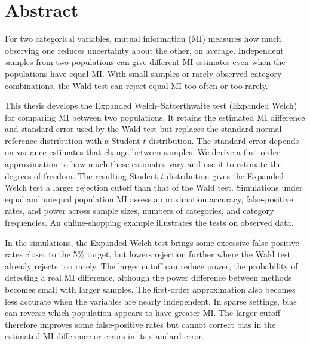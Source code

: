 \chapter*{Abstract}

For two categorical variables, mutual information (MI) measures how much
observing one reduces uncertainty about the other, on average. Independent
samples from two populations can give different MI estimates even when the
populations have equal MI. With small samples or rarely observed category
combinations, the Wald test can reject equal MI too often or too rarely.

This thesis develops the Expanded Welch--Satterthwaite test (Expanded Welch)
for comparing MI between two populations. It retains the estimated MI
difference and standard error used by the Wald test but replaces the standard
normal reference distribution with a Student \(t\) distribution.
The standard error depends on variance estimates that change between
samples. We derive a first-order approximation to how much these estimates
vary and use it to estimate the degrees of freedom. The resulting Student
\(t\) distribution gives the Expanded Welch test a larger rejection cutoff
than that of the Wald test.
Simulations under equal and
unequal population MI assess approximation accuracy, false-positive rates,
and power across sample sizes, numbers of categories, and category
frequencies. An online-shopping example illustrates the tests on observed
data.

In the simulations, the Expanded Welch test brings some excessive false-positive
rates closer to the 5\% target, but lowers rejection further where the Wald test
already rejects too rarely. The larger cutoff can reduce power, the
probability of detecting a real MI difference, although the power difference
between methods becomes small with larger samples. The first-order
approximation also becomes less accurate when the variables are nearly
independent. In sparse settings, bias can reverse which population
appears to have greater MI. The larger cutoff therefore improves some
false-positive rates but cannot correct bias in the estimated MI difference
or errors in its standard error.
